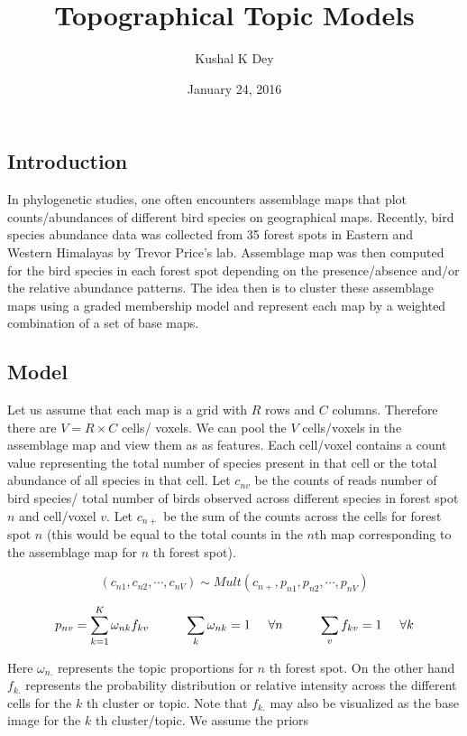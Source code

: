 \documentclass[]{article}
\title{Topographical Topic Models}
\author{Kushal K Dey}
\date{January 24, 2016}
\begin{document}
\maketitle


\subsection{Introduction}\label{introduction}

In phylogenetic studies, one often encounters assemblage maps that plot
counts/abundances of different bird species on geographical maps.
Recently, bird species abundance data was collected from 35 forest spots
in Eastern and Western Himalayas by Trevor Price's lab. Assemblage map
was then computed for the bird species in each forest spot depending on
the presence/absence and/or the relative abundance patterns. The idea
then is to cluster these assemblage maps using a graded membership model
and represent each map by a weighted combination of a set of base maps.

\subsection{Model}\label{model}

Let us assume that each map is a grid with \(R\) rows and \(C\) columns.
Therefore there are \(V = R \times C\) cells/ voxels. We can pool the
\(V\) cells/voxels in the assemblage map and view them as as features.
Each cell/voxel contains a count value representing the total number of
species present in that cell or the total abundance of all species in
that cell. Let \(c_{nv}\) be the counts of reads number of bird species/
total number of birds observed across different species in forest spot
\(n\) and cell/voxel \(v\). Let \(c_{n+}\) be the sum of the counts
across the cells for forest spot \(n\) (this would be equal to the total
counts in the \(n\)th map corresponding to the assemblage map for \(n\)
th forest spot).

\[ (c_{n1}, c_{n2}, \cdots, c_{nV}) \sim Mult (c_{n+}, p_{n1}, p_{n2}, \cdots, p_{nV})  \]

\[ p_{nv} = \sum_{k=1}^{K} \omega_{nk} f_{kv} \hspace{1 cm} \sum_{k} \omega_{nk} =1 \hspace{0.5 cm} \forall n \hspace{1 cm} \sum_{v} f_{kv} =1 \hspace{0.5 cm} \forall k\]

Here \(\omega_{n.}\) represents the topic proportions for \(n\) th
forest spot. On the other hand \(f_{k.}\) represents the probability
distribution or relative intensity across the different cells for the
\(k\) th cluster or topic. Note that \(f_{k.}\) may also be visualized
as the base image for the \(k\) th cluster/topic. We assume the priors
\end{document}
